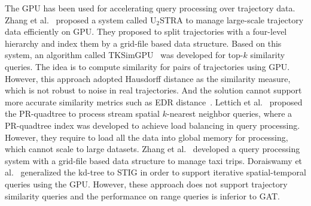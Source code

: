 \documentclass[10pt,conference,letterpaper]{IEEEtran}
\newcommand{\frname}{GAT\xspace }
\begin{document}
\vspace{0.1cm}{\bf GPU-based trajectory query processing.}
%
The GPU has been used for accelerating query processing over trajectory data. Zhang et al.~\cite{Zhang:2012:USH} proposed a system called U$_2$STRA to manage large-scale trajectory data efficiently on GPU. They proposed to split trajectories with a four-level hierarchy and index them by a grid-file based data structure. Based on this system, an algorithm called TKSimGPU~\cite{DBLP:conf/bigdataconf/LealGZY15} was developed for top-$k$ similarity queries. The idea is to compute similarity for pairs of trajectories using GPU.
However, this approach adopted Hausdorff distance as the similarity measure, which is not robust to noise in real trajectories. And the solution cannot support more accurate similarity metrics such as EDR distance~\cite{DBLP:conf/sigmod/ChenOO05}.
%
Lettich et al.~\cite{DBLP:conf/gis/LettichOS15} proposed the PR-quadtree to process stream spatial $k$-nearest neighbor queries, where a PR-quadtree index was developed to achieve load balancing in query processing.
However, they require to load all the data into global memory for processing, which cannot scale to large datasets.
Zhang et al.~\cite{GPUTaxi} developed a query processing system with a grid-file based data structure to manage taxi trips.
Doraiswamy et al.~\cite{7498315} generalized the kd-tree to STIG in order to support iterative spatial-temporal queries using the GPU.
However, these approach does not support trajectory similarity queries and the performance on range queries is inferior to GAT.
\end{document}
